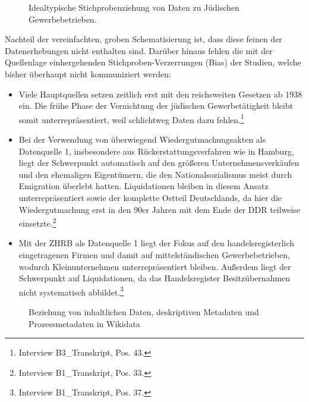\begin{figure}[h]
    \centering
    \caption[Idealtypische Stichprobenziehung]{Idealtypische Stichprobenziehung von Daten zu Jüdischen Gewerbebetrieben.}
    \label{fig:flowchart}
\end{figure}

Nachteil der vereinfachten, groben Schematisierung ist, dass diese feinen der Datenerhebungen nicht enthalten sind. Darüber hinaus fehlen die mit der Quellenlage einhergehenden Stichproben-Verzerrungen (Bias) der Studien, welche bisher überhaupt nicht kommuniziert werden:

\begin{itemize}
    \item Viele Hauptquellen setzen zeitlich erst mit den reichsweiten Gesetzen ab 1938 ein. Die frühe Phase der Vernichtung der jüdischen Gewerbetätigkeit bleibt somit unterrepräsentiert, weil schlichtweg Daten dazu fehlen.\footnote{Interview B3\_Transkript, Pos. 43.}
    \item Bei der Verwendung von überwiegend Wiedergutmachungsakten als Datenquelle 1, insbesondere aus Rückerstattungsverfahren wie in Hamburg, liegt der Schwerpunkt automatisch auf den größeren Unternehmensverkäufen und den ehemaligen Eigentümern, die den Nationalsozialismus meist durch Emigration überlebt hatten. Liquidationen bleiben in diesem Ansatz unterrepräsentiert sowie der komplette Ostteil Deutschlands, da hier die Wiedergutmachung erst in den 90er Jahren mit dem Ende der DDR teilweise einsetzte.\footnote{Interview B1\_Transkript, Pos. 33.}
    \item Mit der ZHRB als Datenquelle 1 liegt der Fokus auf den handelsregisterlich eingetragenen Firmen und damit auf mittelständischen Gewerbebetrieben, wodurch Kleinunternehmen unterrepräsentiert bleiben. Außerdem liegt der Schwerpunkt auf Liquidationen, da das Handelsregister Besitzübernahmen nicht systematisch abbildet.\footnote{Interview B1\_Transkript, Pos. 37.}
\end{itemize}

\begin{figure}[h]
    \centering
    \caption[Beziehung von inhaltlichen Daten und Metadaten in Wikidata]{Beziehung von inhaltlichen Daten, deskriptiven Metadaten und Prozessmetadaten in Wikidata}
    \label{fig:datametadata}
\end{figure}

